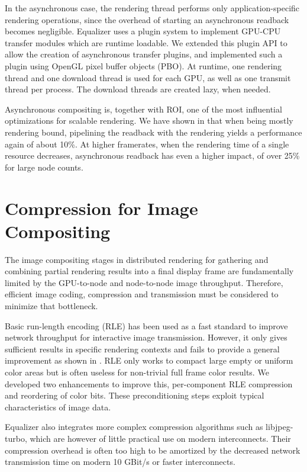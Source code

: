 In the asynchronous case, the rendering thread performs only
application-specific rendering operations, since the overhead of starting an
asynchronous readback becomes negligible. Equalizer uses a plugin system to
implement GPU-CPU transfer modules which are runtime loadable. We extended this
plugin API to allow the creation of asynchronous transfer plugins, and
implemented such a plugin using OpenGL pixel buffer objects (PBO). At runtime,
one rendering thread and one download thread is used for each GPU, as well as
one transmit thread per process. The download threads are created lazy, when
needed.

Asynchronous compositing is, together with ROI, one of the most influential
optimizations for scalable rendering. We have shown in \cite{EBAHMP:12} that
when being mostly rendering bound, pipelining the readback with the rendering
yields a performance again of about 10\%. At higher framerates, when the
rendering time of a single resource decreases, asynchronous readback has even a
higher impact, of over 25\% for large node counts.


\section{Compression for Image Compositing}

The image compositing stages in distributed rendering for gathering and
combining partial rendering results into a final display frame are fundamentally
limited by the GPU-to-node and node-to-node image throughput. Therefore,
efficient image coding, compression and transmission must be considered to
minimize that bottleneck.

Basic run-length encoding (RLE) has been used as a fast standard to improve
network throughput for interactive image transmission. However, it only gives
sufficient results in specific rendering contexts and fails to provide a
general improvement as shown in \cite{MEP:10}. RLE only works to compact large
empty or uniform color areas but is often useless for non-trivial full frame
color results. We developed two enhancements to improve this, per-component RLE
compression and reordering of color bits. These preconditioning steps exploit
typical characteristics of image data.

Equalizer also integrates more complex compression algorithms such as
\textsf{libjpeg-turbo}, which are however of little practical use on modern
interconnects. Their compression overhead is often too high to be amortized by
the decreased network transmission time on modern 10 GBit/s or faster
interconnects.

